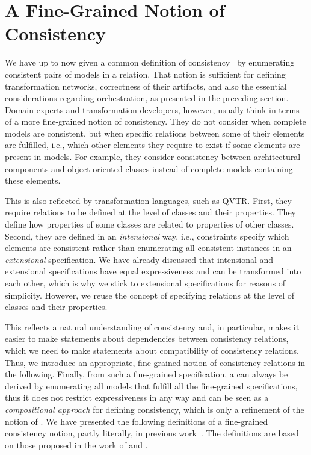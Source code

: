 \section{A Fine-Grained Notion of Consistency}
\label{chap:correctness:finegrained}

We have up to now given a common definition of consistency~\cite{stevens2010sosym} by enumerating consistent pairs of models in a relation.
That notion is sufficient for defining transformation networks, correctness of their artifacts, and also the essential considerations regarding orchestration, as presented in the preceding section.
Domain experts and transformation developers, however, usually think in terms of a more fine-grained notion of consistency.
They do not consider when complete models are consistent, but when specific relations between some of their elements are fulfilled, i.e., which other elements they require to exist if some elements are present in models.
For example, they consider consistency between architectural components and object-oriented classes instead of complete models containing these elements.

This is also reflected by transformation languages, such as \gls{QVTR}.
First, they require relations to be defined at the level of classes and their properties. They define how properties of some classes are related to properties of other classes.
Second, they are defined in an \emph{intensional} way, i.e., constraints specify which elements are consistent rather than enumerating all consistent instances in an \emph{extensional} specification.
We have already discussed that intensional and extensional specifications have equal expressiveness and can be transformed into each other, which is why we stick to extensional specifications for reasons of simplicity.
However, we reuse the concept of specifying relations at the level of classes and their properties.

This reflects a natural understanding of consistency and, in particular, makes it easier to make statements about dependencies between consistency relations, which we need to make statements about compatibility of consistency relations.
Thus, we introduce an appropriate, fine-grained notion of consistency relations in the following.
Finally, from such a fine-grained specification, a \modellevelconsistencyrelation can always be derived by enumerating all models that fulfill all the fine-grained specifications, thus it does not restrict expressiveness in any way and can be seen as a \emph{compositional approach} for defining consistency, which is only a refinement of the notion of \modellevelconsistencyrelations.
We have presented the following definitions of a fine-grained consistency notion, partly literally, in previous work~. 
The definitions are based on those proposed in the work of \textcite[Sec. 2.3.2, 4.1.1]{kramer2017a} and .


